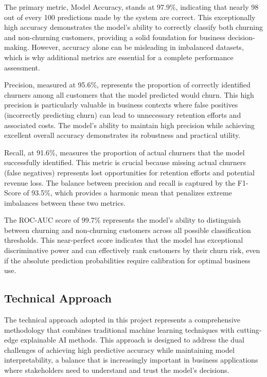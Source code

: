 \documentclass{article}
\begin{document}
The primary metric, Model Accuracy, stands at 97.9\%, indicating that nearly 98 out of every 100 predictions made by the system are correct. This exceptionally high accuracy demonstrates the model's ability to correctly classify both churning and non-churning customers, providing a solid foundation for business decision-making. However, accuracy alone can be misleading in imbalanced datasets, which is why additional metrics are essential for a complete performance assessment.

Precision, measured at 95.6\%, represents the proportion of correctly identified churners among all customers that the model predicted would churn. This high precision is particularly valuable in business contexts where false positives (incorrectly predicting churn) can lead to unnecessary retention efforts and associated costs. The model's ability to maintain high precision while achieving excellent overall accuracy demonstrates its robustness and practical utility.

Recall, at 91.6\%, measures the proportion of actual churners that the model successfully identified. This metric is crucial because missing actual churners (false negatives) represents lost opportunities for retention efforts and potential revenue loss. The balance between precision and recall is captured by the F1-Score of 93.5\%, which provides a harmonic mean that penalizes extreme imbalances between these two metrics.

The ROC-AUC score of 99.7\% represents the model's ability to distinguish between churning and non-churning customers across all possible classification thresholds. This near-perfect score indicates that the model has exceptional discriminative power and can effectively rank customers by their churn risk, even if the absolute prediction probabilities require calibration for optimal business use.

\subsection{Technical Approach}

The technical approach adopted in this project represents a comprehensive methodology that combines traditional machine learning techniques with cutting-edge explainable AI methods. This approach is designed to address the dual challenges of achieving high predictive accuracy while maintaining model interpretability, a balance that is increasingly important in business applications where stakeholders need to understand and trust the model's decisions.
\end{document}
